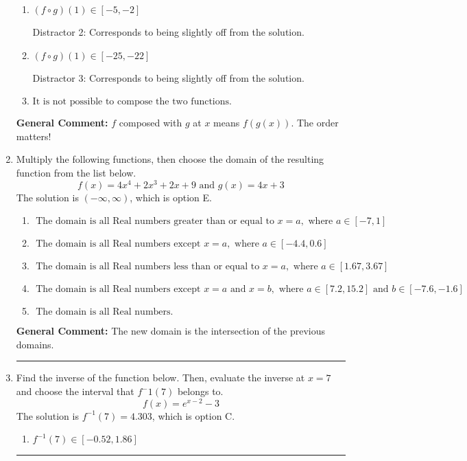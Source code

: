 \documentclass{extbook}[14pt]
\newcommand{\litem}[1]{\item #1

\rule{\textwidth}{0.4pt}}
\begin{document}
\begin{enumerate}
{\begin{enumerate}[label=\Alph*.]
 Distractor 1: Corresponds to reversing the composition.
\item \( (f \circ g)(1) \in [-5, -2] \)

 Distractor 2: Corresponds to being slightly off from the solution.
\item \( (f \circ g)(1) \in [-25, -22] \)

 Distractor 3: Corresponds to being slightly off from the solution.
\item \( \text{It is not possible to compose the two functions.} \)


\end{enumerate}

\textbf{General Comment:} $f$ composed with $g$ at $x$ means $f(g(x))$. The order matters!
}
\litem{
Multiply the following functions, then choose the domain of the resulting function from the list below.
\[ f(x) = 4x^{4} +2 x^{3} +2 x + 9 \text{ and } g(x) = 4x + 3 \]The solution is \( (-\infty, \infty) \), which is option E.\begin{enumerate}[label=\Alph*.]
\item \( \text{ The domain is all Real numbers greater than or equal to } x = a, \text{ where } a \in [-7, 1] \)


\item \( \text{ The domain is all Real numbers except } x = a, \text{ where } a \in [-4.4, 0.6] \)


\item \( \text{ The domain is all Real numbers less than or equal to } x = a, \text{ where } a \in [1.67, 3.67] \)


\item \( \text{ The domain is all Real numbers except } x = a \text{ and } x = b, \text{ where } a \in [7.2, 15.2] \text{ and } b \in [-7.6, -1.6] \)


\item \( \text{ The domain is all Real numbers. } \)


\end{enumerate}

\textbf{General Comment:} The new domain is the intersection of the previous domains.
}
\litem{
Find the inverse of the function below. Then, evaluate the inverse at $x = 7$ and choose the interval that $f^-1(7)$ belongs to.
\[ f(x) = e^{x-2}-3 \]The solution is \( f^{-1}(7) = 4.303 \), which is option C.\begin{enumerate}[label=\Alph*.]
\item \( f^{-1}(7) \in [-0.52, 1.86] \)


\end{enumerate}}
\end{enumerate}
\end{document}
